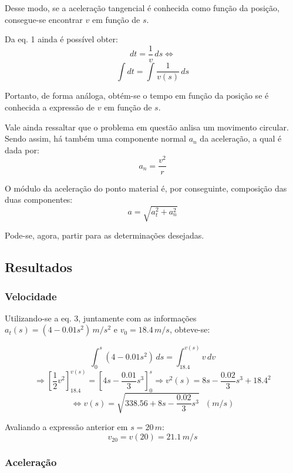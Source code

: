 \documentclass[a4paper, 12pt]{article}
\begin{document}
	Desse modo, se a aceleração tangencial é conhecida como função da posição, consegue-se encontrar $v$ em função de $s$.
	
	Da eq. 1 ainda é possível obter: $$dt=\dfrac{1}{v}\,ds\Longleftrightarrow$$
	\begin{equation}
		\int dt=\int \dfrac{1}{v(s)}\,ds
	\end{equation}
	
	Portanto, de forma análoga, obtém-se o tempo em função da posição se é conhecida a expressão de $v$ em função de $s$.
	
	Vale ainda ressaltar que o problema em questão anlisa um movimento circular. Sendo assim, há também uma componente normal
	$a_n$ da aceleração, a qual é dada por:
	\begin{equation}
		a_n=\dfrac{v^2}{r}
	\end{equation}
	
	\newpage
	
	O módulo da aceleração do ponto material é, por conseguinte, composição das duas componentes:
	\begin{equation}
		a=\sqrt{a_t^2+a_n^2}
	\end{equation}
	
	Pode-se, agora, partir para as determinações desejadas.	
	
	\subsection{Resultados}
	
	\subsubsection{Velocidade}
	
	Utilizando-se a eq. 3, juntamente com as informações $a_t(s)=(4-0.01s^2)\,m/s^2$ e $v_0=18.4\,m/s$, obteve-se:
	
	$$\int_0^s (4-0.01s^2)\,ds=\int_{18.4}^{v(s)} v\,dv$$
	$$\Longrightarrow \left[\frac{1}{2}v^2\right]_{18.4}^{v(s)}=\left[4s-\frac{0.01}{3}s^3\right]_{0}^{s}
	\Longrightarrow v^2(s)=8s-\frac{0.02}{3}s^3+18.4^2$$
	\begin{equation}
		\Longleftrightarrow v(s)=\sqrt{338.56+8s-\frac{0.02}{3}s^3}\,\,\,\,(m/s)
	\end{equation}
	
	Avaliando a expressão anterior em $s=20\,m$: $$v_{20}=v(20)=21.1\,m/s$$
	
	\subsubsection{Aceleração}
	
\end{document}
